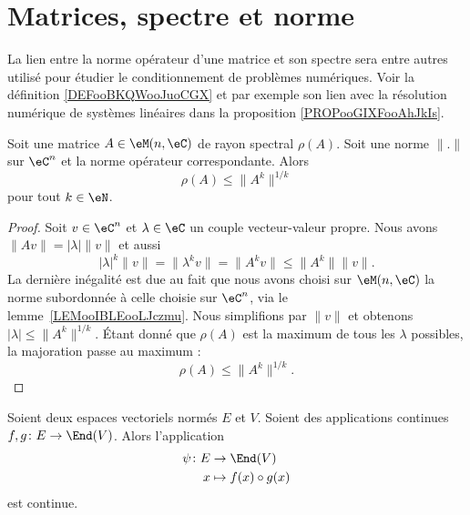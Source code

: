 \section{Matrices, spectre et norme}

La lien entre la norme opérateur d'une matrice et son spectre sera entre autres utilisé pour étudier le conditionnement de problèmes numériques. Voir la définition \ref{DEFooBKQWooJuoCGX} et par exemple son lien avec la résolution numérique de systèmes linéaires dans la proposition \ref{PROPooGIXFooAhJkIs}.

\begin{proposition}      \label{PROPooKLFKooSVnDzr}
	Soit une matrice \( A\in \eM(n,\eC)\) de rayon spectral \( \rho(A)\). Soit une norme \( \| . \|\) sur \( \eC^n\) et la norme opérateur correspondante. Alors
	\begin{equation}
		\rho(A)\leq \| A^k \|^{1/k}
	\end{equation}
	pour tout \( k\in \eN\).
\end{proposition}

\begin{proof}
	Soit \( v\in \eC^n\) et \( \lambda\in \eC\) un couple vecteur-valeur propre. Nous avons \( \| Av \|=| \lambda |\| v \|\) et aussi
	\begin{equation}
		| \lambda |^k\| v \|=\| \lambda^kv \|=\| A^kv \|\leq \| A^k \|\| v \|.
	\end{equation}
	La dernière inégalité est due au fait que nous avons choisi sur \( \eM(n,\eC)\) la norme subordonnée à celle choisie sur \( \eC^n\), via le lemme~\ref{LEMooIBLEooLJczmu}. Nous simplifions par \( \| v \|\) et obtenons \( | \lambda |\leq \| A^k \|^{1/k}\). Étant donné que \( \rho(A)\) est la maximum de tous les \( \lambda\) possibles, la majoration passe au maximum :
	\begin{equation}
		\rho(A)\leq \| A^k \|^{1/k}.
	\end{equation}
\end{proof}

\begin{proposition}     \label{PROPooJGNFooEwtNmJ}
	Soient deux espaces vectoriels normés \( E\) et \( V\). Soient des applications continues \( f,g\colon E\to \End(V)\). Alors l'application
	\begin{equation}
		\begin{aligned}
			\psi\colon E & \to \End(V)            \\
			x            & \mapsto f(x)\circ g(x)
		\end{aligned}
	\end{equation}
	est continue.
\end{proposition}

